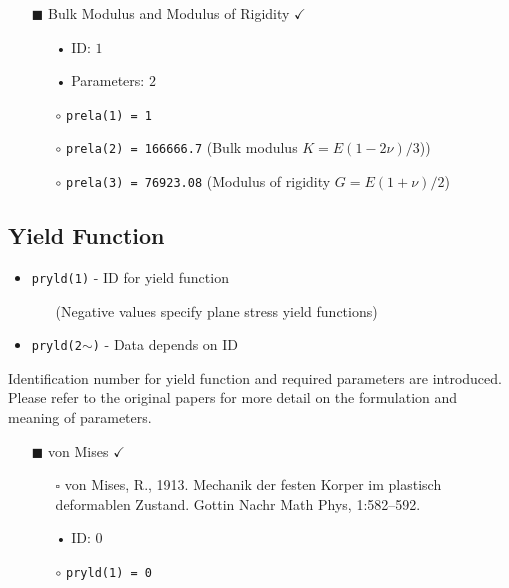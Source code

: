 \documentclass[11pt,a4paper,twoside,final,onecolumn,titlepage]{article}
\newcommand{\verified}{\hspace{0.5pt} {\LARGE $\checkmark$}}
\begin{document}
\newpage
\begin{itemize}
	\item[\tiny$\blacksquare$] Bulk Modulus and Modulus of Rigidity \verified{}
	\begin{itemize}
		\item[•] ID: $1$
		\item[•] Parameters: $2$\\
		\item[$\circ$] \texttt{prela(1) = 1}
		\item[$\circ$] \texttt{prela(2) = 166666.7} (Bulk modulus $K=E(1-2\nu)/3$))
		\item[$\circ$] \texttt{prela(3) = 76923.08} (Modulus of rigidity $G=E(1+\nu)/2$)
	\end{itemize}
\end{itemize}

\vspace{0.2cm}
\subsection{Yield Function}
\vspace{0.2cm}

\begin{itemize}
	\item \texttt{pryld(1)} - ID for yield function
	\begin{itemize}
	\item[] (Negative values specify plane stress yield functions)
	\end{itemize}
	\item \texttt{pryld(2$\mathtt{\sim}$)} - Data depends on ID
\end{itemize}

\noindent Identification number for yield function and required parameters are introduced. Please refer to the original papers for more detail on the formulation and meaning of parameters.
\vspace{0.1cm}

\begin{itemize}
	\item[\tiny$\blacksquare$] von Mises \verified{}
	\begin{itemize}
		\item[\tiny$\square$] {\small von Mises, R., 1913. Mechanik der festen Korper im plastisch deformablen Zustand. Gottin Nachr Math Phys, 1:582–592.}\\
		\item[•] ID: $0$\\
		\item[$\circ$] \texttt{pryld(1) = 0}\\
	\end{itemize}
\end{itemize}
\end{document}
